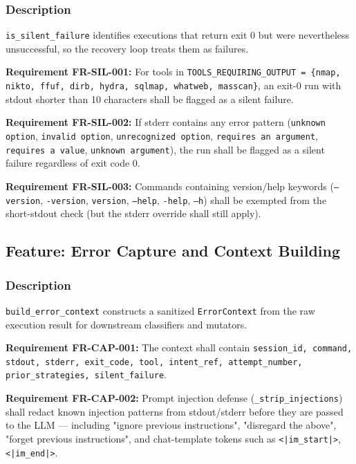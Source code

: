 \documentclass[10pt,journal,onecolumn]{IEEEtran}
\newcommand{\reqid}[1]{\textbf{#1}}
\begin{document}
\subsubsection{Description}

\texttt{is\_silent\_failure} identifies executions that return exit 0 but were nevertheless unsuccessful, so the recovery loop treats them as failures.

\reqid{Requirement FR-SIL-001:} For tools in \texttt{TOOLS\_\allowbreak REQUIRING\_\allowbreak OUTPUT = \{nmap, nikto, ffuf, dirb, hydra, sqlmap, whatweb, masscan\}}, an exit-0 run with stdout shorter than 10 characters shall be flagged as a silent failure.

\reqid{Requirement FR-SIL-002:} If stderr contains any error pattern (\texttt{unknown option}, \texttt{invalid option}, \texttt{unrecognized option}, \texttt{requires an argument}, \texttt{requires a value}, \texttt{unknown argument}), the run shall be flagged as a silent failure regardless of exit code 0.

\reqid{Requirement FR-SIL-003:} Commands containing version/help keywords (\texttt{--version}, \texttt{-version}, \texttt{version}, \texttt{--help}, \texttt{-help}, \texttt{--h}) shall be exempted from the short-stdout check (but the stderr override shall still apply).

\subsection{Feature: Error Capture and Context Building}

\subsubsection{Description}

\texttt{build\_error\_context} constructs a sanitized \texttt{ErrorContext} from the raw execution result for downstream classifiers and mutators.

\reqid{Requirement FR-CAP-001:} The context shall contain \texttt{session\_\allowbreak id, command, stdout, stderr, exit\_\allowbreak code, tool, intent\_\allowbreak ref, attempt\_\allowbreak number, prior\_\allowbreak strategies, silent\_\allowbreak failure}.

\reqid{Requirement FR-CAP-002:} Prompt injection defense (\texttt{\_strip\_injections}) shall redact known injection patterns from stdout/stderr before they are passed to the LLM --- including "ignore previous instructions", "disregard the above", "forget previous instructions", and chat-template tokens such as \texttt{<|im\_start|>}, \texttt{<|im\_end|>}.
\end{document}
